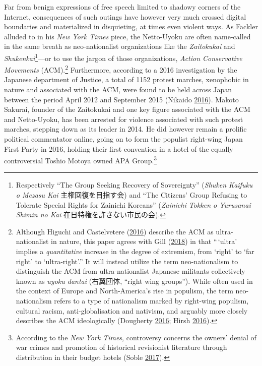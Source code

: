 \documentclass[10pt,british,A4paper,,openany]{memoir}
\begin{document}
Far from benign expressions of free speech limited to shadowy corners of
the Internet, consequences of such outings have however very much
crossed digital boundaries and materialized in disquieting, at times
even violent ways. As Fackler alluded to in his \emph{New York Times}
piece, the Netto-Uyoku are often name-called in the same breath as
neo-nationalist organizations like the \emph{Zaitokukai} and
\emph{Shukenkai}\footnote{Respectively ``The Group Seeking Recovery of
  Sovereignty'' (\emph{Shuken Kaifuku o Mezasu Kai} 主権回復を目指す会)
  and ``The Citizens' Group Refusing to Tolerate Special Rights for
  Zainichi Koreans'' (\emph{Zainichi Tokken o Yurusanai Shimin no Kai}
  在日特権を許さない市民の会).}---or to use the jargon of those
organizations, \emph{Action Conservative Movements} (ACM).\footnote{Although
  Higuchi and Castelvetere
  (\protect\hyperlink{ref-higuchi_japans_2016}{2016}) describe the ACM
  as ultra-nationalist in nature, this paper agrees with Gill
  (\protect\hyperlink{ref-gill_nativist_2018}{2018}) in that ``\,`ultra'
  implies a \emph{quantitative} increase in the degree of extremism,
  from `right' to `far right' to `ultra-right'.'' It will instead
  utilize the term neo-nationalism to distinguish the ACM from
  ultra-nationalist Japanese militants collectively known as \emph{uyoku
  dantai} (右翼団体, ``right wing groups''). While often used in the
  context of Europe and North-America's rise in populism, the term
  neo-nationalism refers to a type of nationalism marked by right-wing
  populism, cultural racism, anti-globalisation and nativism, and
  arguably more closely describes the ACM ideologically (Dougherty
  \protect\hyperlink{ref-dougherty_new_2016}{2016}; Hirsh
  \protect\hyperlink{ref-hirsh_why_2016}{2016}).} Furthermore, according
to a 2016 investigation by the Japanese department of Justice, a total
of 1152 protest marches, xenophobic in nature and associated with the
ACM, were found to be held across Japan between the period April 2012
and September 2015 (Nikaido
\protect\hyperlink{ref-nikaido_eng:_2016}{2016}). Makoto Sakurai,
founder of the Zaitokukai and one key figure associated with the ACM and
Netto-Uyoku, has been arrested for violence associated with such protest
marches, stepping down as its leader in 2014. He did however remain a
prolific political commentator online, going on to form the populist
right-wing Japan First Party in 2016, holding their first convention in
a hotel of the equally controversial Toshio Motoya owned APA
Group.\footnote{According to the \emph{New York Times}, controversy
  concerns the owners' denial of war crimes and promotion of historical
  revisionist literature through distribution in their budget hotels
  (Soble \protect\hyperlink{ref-soble_right-wing_2017}{2017}).}
\end{document}

